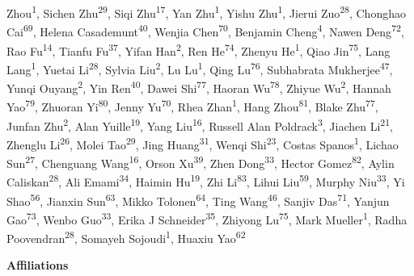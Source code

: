 Zhou\textsuperscript{1}, Sichen Zhu\textsuperscript{29}, Siqi Zhu\textsuperscript{17}, Yan Zhu\textsuperscript{1}, Yishu Zhu\textsuperscript{1}, Jierui Zuo\textsuperscript{28}, Chonghao Cai\textsuperscript{69}, Helena Casademunt\textsuperscript{40}, Wenjia Chen\textsuperscript{70}, Benjamin Cheng\textsuperscript{4}, Nawen Deng\textsuperscript{72}, Rao Fu\textsuperscript{14}, Tianfu Fu\textsuperscript{37}, Yifan Han\textsuperscript{2}, Ren He\textsuperscript{74}, Zhenyu He\textsuperscript{1}, Qiao Jin\textsuperscript{75}, Lang Lang\textsuperscript{1}, Yuetai Li\textsuperscript{28}, Sylvia Liu\textsuperscript{2}, Lu Lu\textsuperscript{1}, Qing Lu\textsuperscript{76}, Subhabrata Mukherjee\textsuperscript{47}, Yunqi Ouyang\textsuperscript{2}, Yin Ren\textsuperscript{40}, Dawei Shi\textsuperscript{77}, Haoran Wu\textsuperscript{78}, Zhiyue Wu\textsuperscript{2}, Hannah Yao\textsuperscript{79}, Zhuoran Yi\textsuperscript{80}, Jenny Yu\textsuperscript{70}, Rhea Zhan\textsuperscript{1}, Hang Zhou\textsuperscript{81}, Blake Zhu\textsuperscript{77}, Junfan Zhu\textsuperscript{2}, Alan Yuille\textsuperscript{19}, Yang Liu\textsuperscript{16}, Russell Alan Poldrack\textsuperscript{3}, Jiachen Li\textsuperscript{21}, Zhenglu Li\textsuperscript{26}, Molei Tao\textsuperscript{29}, Jing Huang\textsuperscript{31}, Wenqi Shi\textsuperscript{23}, Costas Spanos\textsuperscript{1}, Lichao Sun\textsuperscript{27}, Chenguang Wang\textsuperscript{16}, Orson Xu\textsuperscript{39}, Zhen Dong\textsuperscript{33}, Hector Gomez\textsuperscript{82}, Aylin Caliskan\textsuperscript{28}, Ali Emami\textsuperscript{34}, Haimin Hu\textsuperscript{19}, Zhi Li\textsuperscript{83}, Lihui Liu\textsuperscript{59}, Murphy Niu\textsuperscript{33}, Yi Shao\textsuperscript{56}, Jianxin Sun\textsuperscript{63}, Mikko Tolonen\textsuperscript{64}, Ting Wang\textsuperscript{46}, Sanjiv Das\textsuperscript{71}, Yanjun Gao\textsuperscript{73}, Wenbo Guo\textsuperscript{33}, Erika J Schneider\textsuperscript{35}, Zhiyong Lu\textsuperscript{75}, Mark Mueller\textsuperscript{1}, Radha Poovendran\textsuperscript{28}, Somayeh Sojoudi\textsuperscript{1}, Huaxiu Yao\textsuperscript{62}\par
\vspace{4pt}

\medskip
\noindent\textbf{Affiliations}
\vspace{4pt}

